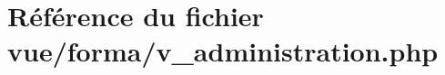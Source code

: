 \hypertarget{v__administration_8php}{}\section{Référence du fichier vue/forma/v\+\_\+administration.php}
\label{v__administration_8php}
